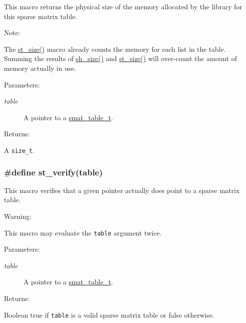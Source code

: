 This macro returns the physical size of the memory allocated by the library for this sparse matrix table.

\begin{Desc}
\item[Note: ]\par
The \hyperlink{group__dbprim__smat_a27}{st\_\-size()} macro already counts the memory for each list in the table. Summing the results of \hyperlink{group__dbprim__smat_a37}{sh\_\-size()} and \hyperlink{group__dbprim__smat_a27}{st\_\-size()} will over-count the amount of memory actually in use.\end{Desc}
\begin{Desc}
\item[Parameters: ]\par
\begin{description}
\item[{\em 
table}]A pointer to a \hyperlink{group__dbprim__smat_a0}{smat\_\-table\_\-t}.\end{description}
\end{Desc}
\begin{Desc}
\item[Returns: ]\par
A {\tt size\_\-t}. \end{Desc}
\hypertarget{group__dbprim__smat_a21}{
\subsubsection[st\_\-verify]{\setlength{\rightskip}{0pt plus 5cm}\#define st\_\-verify(table)}}
\label{group__dbprim__smat_a21}


This macro verifies that a given pointer actually does point to a sparse matrix table.

\begin{Desc}
\item[Warning: ]\par
This macro may evaluate the {\tt table} argument twice.\end{Desc}
\begin{Desc}
\item[Parameters: ]\par
\begin{description}
\item[{\em 
table}]A pointer to a \hyperlink{group__dbprim__smat_a0}{smat\_\-table\_\-t}.\end{description}
\end{Desc}
\begin{Desc}
\item[Returns: ]\par
Boolean true if {\tt table} is a valid sparse matrix table or false otherwise. \end{Desc}


